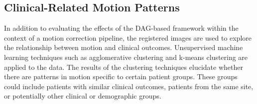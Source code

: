 \subsection{Clinical-Related Motion Patterns} %

In addition to evaluating the effects of the DAG-based framework within the context of a motion correction pipeline, the registered images are used to explore the relationship between motion and clinical outcomes. Unsupervised machine learning techniques such as agglomerative clustering and k-means clustering are applied to the data. The results of the clustering techniques elucidate whether there are patterns in motion specific to certain patient groups. These groups could include patients with similar clinical outcomes, patients from the same site, or potentially other clinical or demographic groups.




